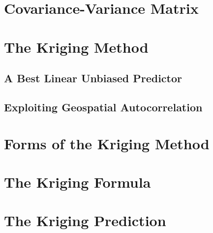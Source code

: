 \documentclass[11pt]{ucthesis}
\begin{document}
\section{Covariance-Variance Matrix}

\section{The Kriging Method}
\subsection{A Best Linear Unbiased Predictor}
\subsection{Exploiting Geospatial Autocorrelation}
\section{Forms of the Kriging Method}
\section{The Kriging Formula}
\section{The Kriging Prediction}
\end{document}
